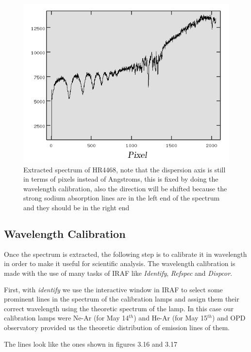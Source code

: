 \begin{figure}[H]
\centering
\includegraphics[width=12cm]{images/calib_star_apall.png}
\caption[Spectrum of calibration star HR4468]{Extracted spectrum of HR4468, note that the dispersion axis is still in terms of pixels instead of Angstroms, this is fixed by doing the wavelength calibration, also the direction will be shifted because the strong sodium absorption lines are in the left end of the spectrum and they should be in the right end}
\end{figure}

\subsection{Wavelength Calibration}

Once the spectrum is extracted, the following step is to calibrate it in wavelength in order to make it useful for scientific analysis. The wavelength calibration is made with the use of many tasks of IRAF like \textit{Identify}, \textit{Refspec} and \textit{Dispcor}. 

First, with \textit{identify} we use the interactive window in IRAF to select some prominent lines in the spectrum of the calibration lamps and assign them their correct wavelength using the theoretic spectrum of the lamp. In this case our calibration lamps were Ne-Ar (for May 14$^{th}$) and He-Ar (for May 15$^{th}$)  and OPD observatory provided us the theoretic distribution of emission lines of them. 

The lines look like the ones shown in figures 3.16 and 3.17

